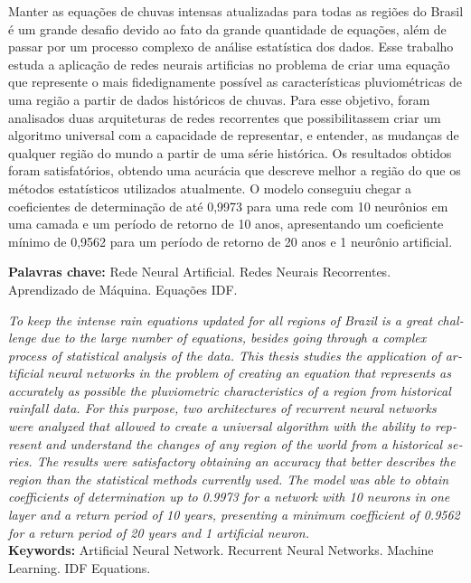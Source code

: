 
\setlength{\absparsep}{18pt} %

\begin{resumo}
Manter as equações de chuvas intensas atualizadas para todas as regiões do Brasil é um grande desafio devido ao fato da grande quantidade de equações, além de passar por um processo complexo de análise estatística dos dados. Esse trabalho estuda a aplicação de redes neurais artificias no problema de criar uma equação que represente o mais fidedignamente possível as características pluviométricas de uma região a partir de dados históricos de chuvas. Para esse objetivo, foram analisados duas arquiteturas de redes recorrentes que possibilitassem criar um algoritmo universal com a capacidade de representar, e entender, as mudanças de qualquer região do mundo a partir de uma série histórica. Os resultados obtidos foram satisfatórios, obtendo uma acurácia que descreve melhor a região do que os métodos estatísticos utilizados atualmente. O modelo conseguiu chegar a coeficientes de determinação de até 0,9973 para uma rede com 10 neurônios em uma camada e um período de retorno de 10 anos, apresentando um coeficiente mínimo de 0,9562 para um período de retorno de 20 anos e 1 neurônio artificial.

\textbf{Palavras chave:} Rede Neural Artificial. Redes Neurais Recorrentes. Aprendizado de Máquina. Equações IDF.

\end{resumo}

\begin{resumo}[Abstract]
    \foreignlanguage{english}
    {
        \textit{
        To keep the intense rain equations updated for all regions of Brazil is a great challenge due to the large number of equations, besides going through a complex process of statistical analysis of the data. This thesis studies the application of artificial neural networks in the problem of creating an equation that represents as accurately as possible the pluviometric characteristics of a region from historical rainfall data. For this purpose, two architectures of recurrent neural networks were analyzed that allowed to create a universal algorithm with the ability to represent and understand the changes of any region of the world from a historical series. The results were satisfactory obtaining an accuracy that better describes the region than the statistical methods currently used. The model was able to obtain coefficients of determination up to 0.9973 for a network with 10 neurons in one layer and a return period of 10 years, presenting a minimum coefficient of 0.9562 for a return period of 20 years and 1 artificial neuron.
        }
    }
    \vspace{\onelineskip}
    \noindent 
    \textbf{\\Keywords:} Artificial Neural Network. Recurrent Neural Networks. Machine Learning. IDF Equations.

\end{resumo}